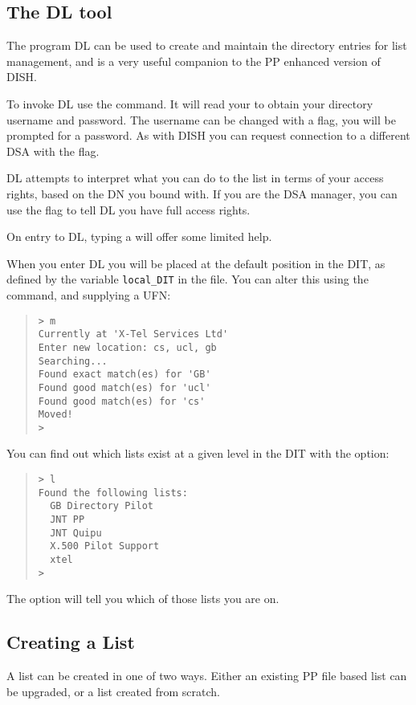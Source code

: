 \subsection{The DL tool}

The program DL can be used to create and maintain the directory
entries for list management, and is a very useful companion to the
PP enhanced version of DISH.

To invoke DL use the  command.  It will read your
 to obtain your directory username and password.
The username can be changed with a  flag, you will be
prompted for a password.
As with DISH you can request connection to a different DSA with the
 flag.

DL attempts to interpret what you can do to the list in terms of your
access rights, based on the DN you bound with.  If you are the DSA
manager, you can use the   flag to tell DL you have full
access rights.

On entry to DL, typing a  will offer some limited help.

When you enter DL you will be placed at the default position in the
DIT, as defined by the variable \verb+local_DIT+ in the 
 file.  You can alter this using the 
command, and supplying a UFN:

\begin{quote}\begin{verbatim}
> m
Currently at 'X-Tel Services Ltd'
Enter new location: cs, ucl, gb
Searching...
Found exact match(es) for 'GB'
Found good match(es) for 'ucl'
Found good match(es) for 'cs'
Moved!
>
\end{verbatim}\end{quote}

You can find out which lists exist at a given level in the DIT with
the  option:
\begin{quote}\begin{verbatim}
> l
Found the following lists:
  GB Directory Pilot
  JNT PP
  JNT Quipu
  X.500 Pilot Support
  xtel
>
\end{verbatim}\end{quote}
The  option will tell you which of those lists you are on.

\subsection{Creating a List}

A list can be created in one of two ways.  Either an existing PP file
based list can be upgraded, or a list created from scratch.

